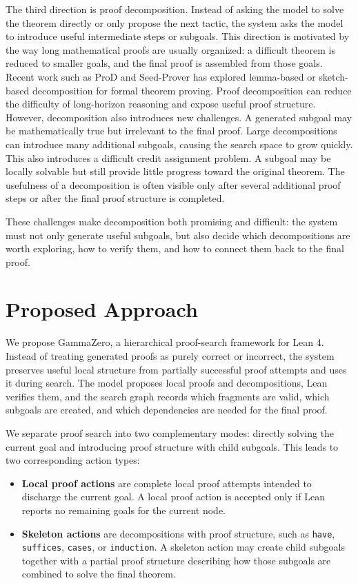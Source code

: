 \documentclass[en]{uet_awesome_thesis/uet-awesome-thesis}
\begin{document}
The third direction is proof decomposition. Instead of asking the model to solve the theorem directly or only propose the next tactic, the system asks the model to introduce useful intermediate steps or subgoals. This direction is motivated by the way long mathematical proofs are usually organized: a difficult theorem is reduced to smaller goals, and the final proof is assembled from those goals. Recent work such as ProD \cite{ProD} and Seed-Prover \cite{seedProver} has explored lemma-based or sketch-based decomposition for formal theorem proving.
Proof decomposition can reduce the difficulty of long-horizon reasoning and expose useful proof structure. However, decomposition also introduces new challenges. A generated subgoal may be mathematically true but irrelevant to the final proof. Large decompositions can introduce many additional subgoals, causing the search space to grow quickly. This also introduces a difficult credit assignment problem. A subgoal may be locally solvable but still provide little progress toward the original theorem. The usefulness of a decomposition is often visible only after several additional proof steps or after the final proof structure is completed.

These challenges make decomposition both promising and difficult: the system must not only generate useful subgoals, but also decide which decompositions are worth exploring, how to verify them, and how to connect them back to the final proof.

\section{Proposed Approach}

We propose GammaZero, a hierarchical proof-search framework for Lean 4. Instead of treating generated proofs as purely correct or incorrect, the system preserves useful local structure from partially successful proof attempts and uses it during search. The model proposes local proofs and decompositions, Lean verifies them, and the search graph records which fragments are valid, which subgoals are created, and which dependencies are needed for the final proof. 

We separate proof search into two complementary modes: directly solving the current goal and introducing proof structure with child subgoals. This leads to two corresponding action types:
\begin{itemize}
  \item \textbf{Local proof actions} are complete local proof attempts intended to discharge the current goal. A local proof action is accepted only if Lean reports no remaining goals for the current node.
  \item \textbf{Skeleton actions} are decompositions with proof structure, such as \texttt{have}, \texttt{suffices}, \texttt{cases}, or \texttt{induction}. A skeleton action may create child subgoals together with a partial proof structure describing how those subgoals are combined to solve the final theorem.
\end{itemize}
\end{document}

